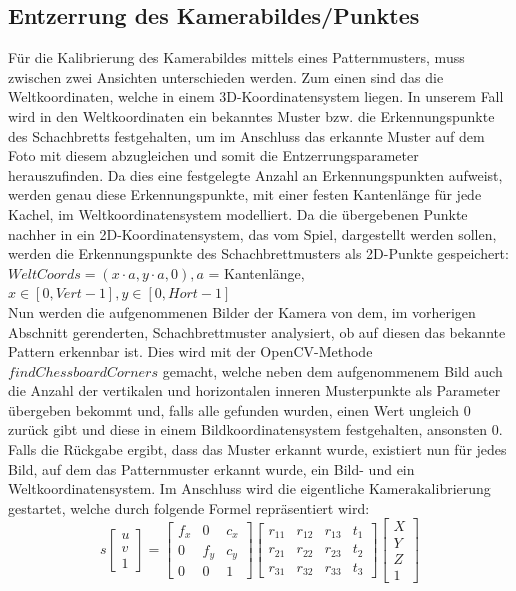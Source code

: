 \subsection{Entzerrung des Kamerabildes/Punktes}
Für die Kalibrierung des Kamerabildes mittels eines Patternmusters, muss zwischen zwei Ansichten unterschieden werden. Zum einen sind das die Weltkoordinaten, welche in einem 3D-Koordinatensystem liegen. In unserem Fall wird in den Weltkoordinaten ein bekanntes Muster bzw. die Erkennungspunkte des Schachbretts festgehalten, um im Anschluss das erkannte Muster auf dem Foto mit diesem abzugleichen und somit die Entzerrungsparameter herauszufinden. Da dies eine festgelegte Anzahl an Erkennungspunkten aufweist, werden genau diese Erkennungspunkte, mit einer festen Kantenlänge für jede Kachel, im Weltkoordinatensystem modelliert. Da die übergebenen Punkte nachher in ein 2D-Koordinatensystem, das vom Spiel, dargestellt werden sollen, werden die Erkennungspunkte des Schachbrettmusters als 2D-Punkte gespeichert:\\
$WeltCoords = (x \cdot a, y \cdot a, 0), a$ = Kantenlänge, $x \in [0,Vert-1], y \in [0,Hort-1]$\\
Nun werden die aufgenommenen Bilder der Kamera von dem, im vorherigen Abschnitt gerenderten, Schachbrettmuster analysiert, ob auf diesen das bekannte Pattern erkennbar ist. Dies wird mit der OpenCV-Methode $findChessboardCorners$ gemacht, welche neben dem aufgenommenem Bild auch die Anzahl der vertikalen und horizontalen inneren Musterpunkte als Parameter übergeben bekommt und, falls alle gefunden wurden, einen Wert ungleich 0 zurück gibt und diese in einem Bildkoordinatensystem festgehalten, ansonsten 0. Falls die Rückgabe ergibt, dass das Muster erkannt wurde, existiert nun für jedes Bild, auf dem das Patternmuster erkannt wurde, ein Bild- und ein Weltkoordinatensystem.
Im Anschluss wird die eigentliche Kamerakalibrierung gestartet, welche durch folgende Formel repräsentiert wird:\\
\[s
\begin{bmatrix}
u\\v\\1
\end{bmatrix}=
\begin{bmatrix}
f_{x} & 0 & c_{x}\\
0 & f_{y} & c_{y}\\
0 & 0 & 1
\end{bmatrix}
\begin{bmatrix}
r_{11} & r_{12} & r_{13} & t_{1} \\
r_{21} & r_{22} & r_{23} & t_{2} \\
r_{31} & r_{32} & r_{33} & t_{3}
\end{bmatrix}
\begin{bmatrix}
X\\Y\\Z\\1
\end{bmatrix}
\]
